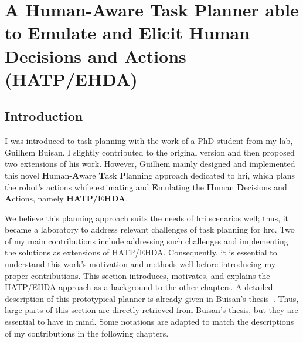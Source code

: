 \cleardoublepage

\ifdefined{}
\else
\setcounter{chapter}{1} %
\dominitoc
\faketableofcontents
\fi

\chapter{A Human-Aware Task Planner able to Emulate and Elicit Human Decisions and Actions (HATP/EHDA)}
\label{chap:2}
\minitoc


\section{Introduction}

I was introduced to task planning with the work of a PhD student from my lab, Guilhem Buisan. I slightly contributed to the original version and then proposed two extensions of his work. However, Guilhem mainly designed and implemented this novel \textbf{H}uman-\textbf{A}ware \textbf{T}ask \textbf{P}lanning approach dedicated to \acrfull{hri}, which plans the robot's actions while estimating and \textbf{E}mulating the \textbf{H}uman \textbf{D}ecisions and \textbf{A}ctions, namely \textbf{HATP/EHDA}. 

We believe this planning approach suits the needs of \acrshort{hri} scenarios well; thus, it became a laboratory to address relevant challenges of task planning for \acrshort{hrc}. 
Two of my main contributions include addressing such challenges and implementing the solutions as extensions of HATP/EHDA.   
Consequently, it is essential to understand this work's motivation and methods well before introducing my proper contributions. This section introduces, motivates, and explains the HATP/EHDA approach as a background to the other chapters. 
A detailed description of this prototypical planner is already given in Buisan's thesis~\cite{thesisBuisan21}. Thus, large parts of this section are directly retrieved from Buisan's thesis, but they are essential to have in mind. Some notations are adapted to match the descriptions of my contributions in the following chapters. 

